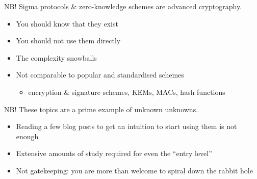 \begin{frame}{NB!}
  Sigma protocols \& zero-knowledge schemes are advanced cryptography.
  \begin{itemize}[<+(1)->]
    \item You should know that they exist
    \item You should not use them directly
    \item The complexity snowballs
    \item Not comparable to popular and standardised schemes
    \par
    \begin{itemize}
      \item encryption \& signature schemes, KEMs, MACs, hash functions
    \end{itemize}
  \end{itemize}
\end{frame}

\begin{frame}{NB!}
  These topics are a prime example of unknown unknowns.
  \begin{itemize}[<+(1)->]
    \item Reading a few blog posts to get an intuition to start using them is not enough
    \item Extensive amounts of study required for even the \enquote{entry level}
    \item Not gatekeeping:
    you are more than welcome to spiral down the rabbit hole
  \end{itemize}
\end{frame}


